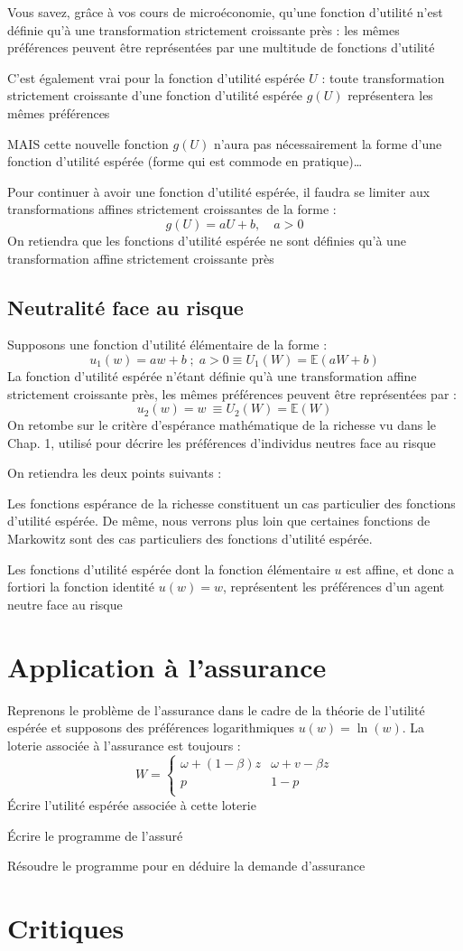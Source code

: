\documentclass[a4paper, 12pt]{report}
\begin{document}
Vous savez, grâce à vos cours de microéconomie, qu'une fonction d'utilité n'est définie qu'à une transformation strictement croissante près : les mêmes préférences peuvent être représentées par une multitude de fonctions d'utilité

C'est également vrai pour la fonction d'utilité espérée $U$ : toute transformation strictement croissante d'une fonction d'utilité espérée $g(U)$ représentera les mêmes préférences

MAIS cette nouvelle fonction $g(U)$ n'aura pas nécessairement la forme d'une fonction d'utilité espérée (forme qui est commode en pratique)…

Pour continuer à avoir une fonction d'utilité espérée, il faudra se limiter aux transformations affines strictement croissantes de la forme :
$$
g(U)=aU+b, \quad a>0
$$
On retiendra que les fonctions d'utilité espérée ne sont définies qu'à une transformation affine strictement croissante près

\subsection{Neutralité face au risque}

Supposons une fonction d'utilité élémentaire de la forme :
$$
u_1(w)=aw+b\;;\;a>0 \equiv U_1(W)=\mathbb{E}(aW+b)
$$
La fonction d'utilité espérée n'étant définie qu'à une transformation affine strictement croissante près, les mêmes préférences peuvent être représentées par :
$$
u_2(w)=w\ \equiv U_2(W)=\mathbb{E}(W)
$$
On retombe sur le critère d'espérance mathématique de la richesse vu dans le Chap. 1, utilisé pour décrire les préférences d'individus neutres face au risque

On retiendra les deux points suivants :

Les fonctions espérance de la richesse constituent un cas particulier des fonctions d'utilité espérée. De même, nous verrons plus loin que certaines fonctions de Markowitz sont des cas particuliers des fonctions d'utilité espérée.

Les fonctions d'utilité espérée dont la fonction élémentaire $u$ est affine, et donc a fortiori la fonction identité $u(w)=w$, représentent les préférences d'un agent neutre face au risque

\section{Application à l'assurance}

Reprenons le problème de l'assurance dans le cadre de la théorie de l'utilité espérée et supposons des préférences logarithmiques $u(w)=\ln(w)$. La loterie associée à l'assurance est toujours :
$$
W= \left\{\begin{matrix}
	\omega + (1-\beta)z& \omega + v -\beta z \\
	p & 1-p \\
\end{matrix}\right.
$$
Écrire l'utilité espérée associée à cette loterie

Écrire le programme de l'assuré

Résoudre le programme pour en déduire la demande
d'assurance



\section{Critiques}
\end{document}
